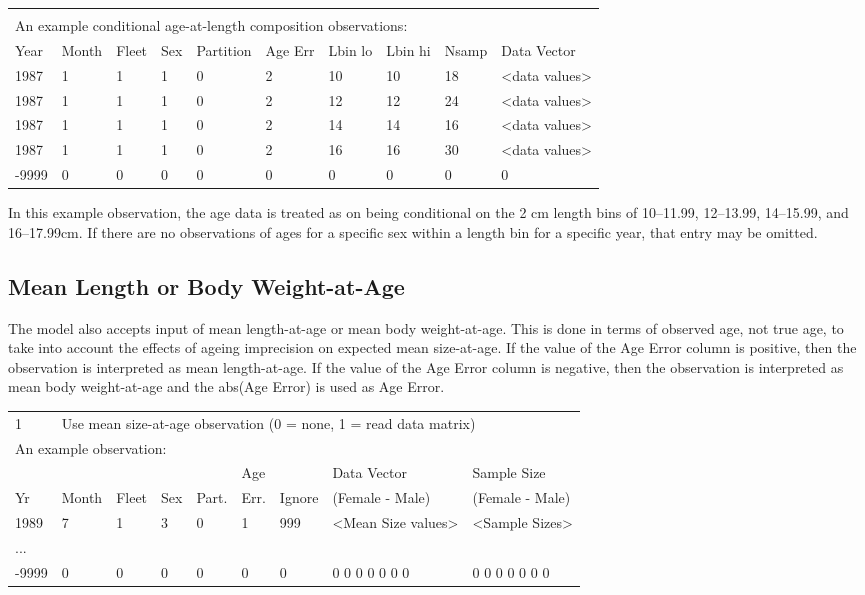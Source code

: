 \begin{tabular}{p{0.9cm} p{1cm} p{0.9cm} p{0.9cm} p{1.5cm} p{0.9cm} p{0.9cm} p{0.9cm} p{1cm} p{2.4cm}}
	\multicolumn{10}{l}{ }\\
	\multicolumn{10}{l}{An example conditional age-at-length composition observations:}\\
	\hline
	Year & Month & Fleet & Sex & Partition & Age Err & Lbin lo & Lbin hi & Nsamp & Data Vector \Tstrut\\
	\hline
	1987 & 1 & 1 & 1 & 0 & 2 & 10 & 10 & 18 & <data values>\Tstrut\\
	1987 & 1 & 1 & 1 & 0 & 2 & 12 & 12 & 24 & <data values>\Tstrut\\
	1987 & 1 & 1 & 1 & 0 & 2 & 14 & 14 & 16 & <data values>\Tstrut\\
	1987 & 1 & 1 & 1 & 0 & 2 & 16 & 16 & 30 & <data values>\Tstrut\\
	-9999 & 0 & 0 & 0 & 0 & 0 & 0 & 0 & 0 & 0\Bstrut\\
	\hline
\end{tabular}

In this example observation, the age data is treated as on being conditional on the 2 cm length bins of 10--11.99, 12--13.99, 14--15.99, and 16--17.99cm. If there are no observations of ages for a specific sex within a length bin for a specific year, that entry may be omitted.

\subsection{Mean Length or Body Weight-at-Age}
The model also accepts input of mean length-at-age or mean body weight-at-age.  This is done in terms of observed age, not true age, to take into account the effects of ageing imprecision on expected mean size-at-age.  If the value of the Age Error column is positive, then the observation is interpreted as mean length-at-age.  If the value of the Age Error column is negative, then the observation is interpreted as mean body weight-at-age and the abs(Age Error) is used as Age Error.

\begin{center}
	\begin{tabular}{p{0.75cm} p{1cm} p{0.75cm} p{1cm} p{0.75cm} p{1cm} p{1cm} p{3.2cm} p{3.2cm} }
		\hline
		1 & \multicolumn{8}{l}{Use mean size-at-age observation (0 = none, 1 = read data matrix)} \Tstrut\\
		\multicolumn{9}{l}{An example observation:}\Bstrut\\
		\hline
		   &       &       &     &       & Age  &        & Data Vector     & Sample Size \Tstrut\\
		Yr & Month & Fleet & Sex & Part. & Err. & Ignore & (Female - Male) & (Female - Male) \Bstrut\\
		\hline
		1989  & 7 & 1 & 3 & 0 & 1 & 999 & <Mean Size values> & <Sample Sizes> \Tstrut\\
		...   &   &   &   &   &   &   &  & \\
		-9999 & 0 & 0 & 0 & 0 & 0 & 0 &  0 0 0 0 0 0 0 & 0 0 0 0 0 0 0 \Bstrut\\
		\hline
	\end{tabular}
\end{center}


